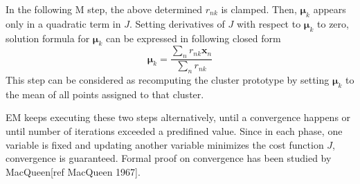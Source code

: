 In the following M step, the above determined \(r_{nk}\) is clamped. Then, \(\boldsymbol{\mu}_k\) appears only in a quadratic term in \(J\). Setting derivatives of \(J\) with respect to \(\boldsymbol{\mu}_k\) to zero, solution formula for \(\boldsymbol{\mu}_k\) can be expressed in following closed form
\begin{equation}
\boldsymbol{\mu}_{k} = \frac{\sum_n r_{nk}\mathbf{x}_n}{\sum_n r_{nk}}
\end{equation}
This step can be considered as recomputing the cluster prototype by setting \(\boldsymbol{\mu}_k\) to the mean of all points assigned to that cluster. 

EM keeps executing these two steps alternatively, until a convergence happens or until number of iterations exceeded a predifined value. Since in each phase, one variable is fixed and updating another variable minimizes the cost function \(J\), convergence is guaranteed. Formal proof on convergence has been studied by MacQueen[ref MacQueen 1967].


